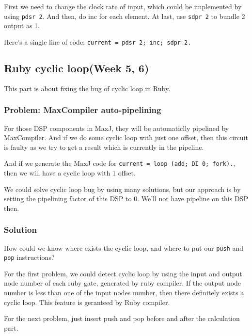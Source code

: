 First we need to change the clock rate of input, which could be implemented by using \texttt{pdsr 2}. And then, do inc for each element. At last, use \texttt{sdpr 2} to bundle 2 output as 1.

Here's a single line of code: \lstinline{current = pdsr 2; inc; sdpr 2.}

\subsection{Ruby cyclic loop(Week 5, 6)}

This part is about fixing the bug of cyclic loop in Ruby.

\subsubsection{Problem: MaxCompiler auto-pipelining}

For those DSP components in MaxJ, they will be automaticlly pipelined by MaxCompiler. And if we do some cyclic loop with just one offset, then this circuit is faulty as we try to get a result which is currently in the pipeline.

And if we generate the MaxJ code for \lstinline{current = loop (add; DI 0; fork).}, then we will have a cyclic loop with 1 offset.

We could solve cyclic loop bug by using many solutions, but our approach is by setting the pipelining factor of this DSP to 0. We'll not have pipeline on this DSP then.

\subsubsection{Solution}

How could we know where exists the cyclic loop, and where to put our \texttt{push} and \texttt{pop} instructions? 

For the first problem, we could detect cyclic loop by using the input and output node number of each ruby gate, generated by ruby compiler. If the output node number is less than one of the input nodes number, then there definitely exists a cyclic loop. This feature is geranteed by Ruby compiler.

For the next problem, just insert push and pop before and after the calculation part.